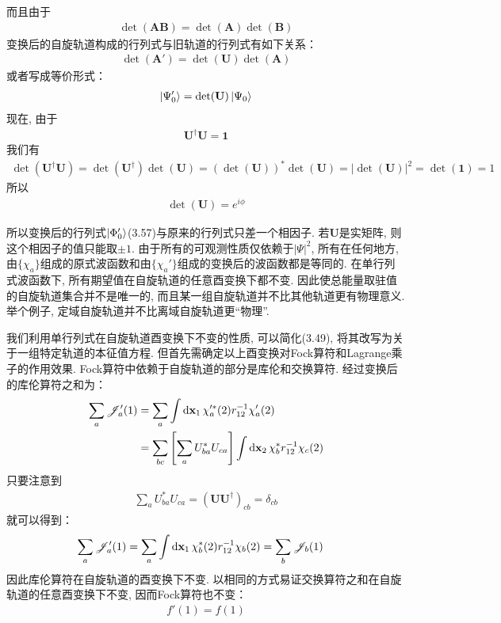 而且由于
\begin{align}
\det(\mathbf{AB}) = \det(\mathbf{A})\det(\mathbf{B})
\end{align}
变换后的自旋轨道构成的行列式与旧轨道的行列式有如下关系：
\begin{align}
\det(\mathbf{A}') = \det(\mathbf{U})\det(\mathbf{A})
\end{align}
或者写成等价形式：
\begin{align}
\Ket{\Psi_0'} = \det(\mathbf{U})\Ket{\Psi_0}
\end{align}
现在, 由于
\begin{align}
\mathbf{U}^\dagger\mathbf{U} = \mathbf{1}
\end{align}
我们有
\begin{align}
\det(\mathbf{U}^\dagger\mathbf{U}) = \det(\mathbf{U}^\dagger)\det(\mathbf{U}) = (\det(\mathbf{U}))^*\det(\mathbf{U}) = |\det(\mathbf{U})|^2 = \det(\mathbf{1}) = 1
\end{align}
所以
\begin{align}
\det(\mathbf{U}) = e^{i\phi}
\end{align}

所以变换后的行列式$\Ket{\Phi_0'}$(3.57)与原来的行列式只差一个相因子. 若$\mathbf{U}$是实矩阵, 则这个相因子的值只能取$\pm 1$. 由于所有的可观测性质仅依赖于$|\Psi|^2$, 所有在任何地方, 由$\{\chi_a\}$组成的原式波函数和由$\{\chi_a'\}$组成的变换后的波函数都是等同的. 在单行列式波函数下, 所有期望值在自旋轨道的任意酉变换下都不变. 因此使总能量取驻值的自旋轨道集合并不是唯一的, 而且某一组自旋轨道并不比其他轨道更有物理意义. 举个例子, 定域自旋轨道并不比离域自旋轨道更“物理”.

我们利用单行列式在自旋轨道酉变换下不变的性质, 可以简化(3.49), 将其改写为关于一组特定轨道的本征值方程. 但首先需确定以上酉变换对Fock算符和Lagrange乘子的作用效果. Fock算符中依赖于自旋轨道的部分是库伦和交换算符. 经过变换后的库伦算符之和为：
\begin{align}
\sum_a \scr{J}_a'(1) & = \sum_a\int\dd{x}_1\,\chi_a^{\prime*}(2)\twoe\chi_a'(2)\notag\\
                     & = \sum_{bc}\left[ \sum_a U_{ba}^* U_{ca}\right]\int\dd{x}_2\,\chi_b^*\twoe\chi_c(2)
\end{align}
只要注意到
\begin{align}
\sum_a U_{ba}^* U_{ca} = (\mathbf{UU}^\dagger)_{cb} = \delta_{cb}
\end{align}
就可以得到：
\begin{align}
\sum_a \scr{J}_a'(1) & = \sum_a\int\dd{x}_1\,\chi_b^{*}(2)\twoe\chi_b(2) = \sum_{b}\scr{J}_b(1)
\end{align}
因此库伦算符在自旋轨道的酉变换下不变. 以相同的方式易证交换算符之和在自旋轨道的任意酉变换下不变, 因而Fock算符也不变：
\begin{align}
f'(1) = f(1)
\end{align}

